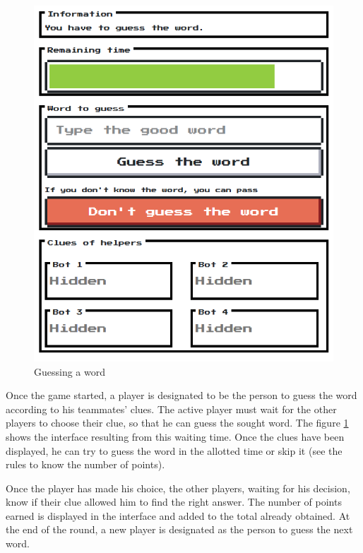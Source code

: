 \documentclass{tnreport}
\begin{document}
\begin{figure}
	\centering
	\vspace*{-0.7cm}
	\includegraphics[scale=0.4]{figures/guessing_word}
	\caption{Guessing a word}
	\label{fig:guessing_word}
\end{figure} 

Once the game started, a player is designated to be the person to guess the word according to his teammates' clues. The active player must wait for the other players to choose their clue, so that he can guess the sought word. The figure \ref{fig:guessing_word} shows the interface resulting from this waiting time. Once the clues have been displayed, he can try to guess the word in the allotted time or skip it (see the rules to know the number of points). 

Once the player has made his choice, the other players, waiting for his decision, know if their clue allowed him to find the right answer. The number of points earned is displayed in the interface and added to the total already obtained. At the end of the round, a new player is designated as the person to guess the next word.
\end{document}
